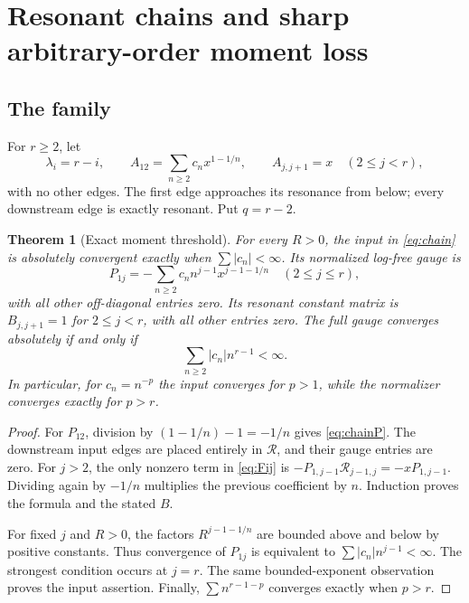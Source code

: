 \documentclass[11pt,a4paper]{article}
\numberwithin{equation}{section}
\newtheorem{theorem}{Theorem}[section]
\theoremstyle{definition}
\theoremstyle{remark}
\begin{document}
\section{Resonant chains and sharp arbitrary-order moment loss}
\label{sec:chain}

\subsection{The family}
For $r\geq2$, let
\begin{equation}\label{eq:chain}
 \lambda_i=r-i,\qquad
 A_{12}=\sum_{n\geq2}c_nx^{1-1/n},\qquad
 A_{j,j+1}=x\quad(2\leq j<r),
\end{equation}
with no other edges. The first edge approaches its resonance from below;
every downstream edge is exactly resonant. Put $q=r-2$.

\begin{theorem}[Exact moment threshold]\label{thm:chain}
For every $R>0$, the input in \eqref{eq:chain} is absolutely convergent
exactly when $\sum|c_n|<\infty$. Its normalized log-free gauge is
\begin{equation}\label{eq:chainP}
 P_{1j}=-\sum_{n\geq2}c_n n^{j-1}x^{j-1-1/n}
       \quad(2\leq j\leq r),
\end{equation}
with all other off-diagonal entries zero. Its resonant constant matrix is
$B_{j,j+1}=1$ for $2\leq j<r$, with all other entries zero. The full gauge
converges absolutely if and only if
\begin{equation}\label{eq:moment}
 \sum_{n\geq2}|c_n|n^{r-1}<\infty.
\end{equation}
In particular, for $c_n=n^{-p}$ the input converges for $p>1$, while the
normalizer converges exactly for $p>r$.
\end{theorem}
\begin{proof}
For $P_{12}$, division by $(1-1/n)-1=-1/n$ gives
\eqref{eq:chainP}. The downstream input edges are placed entirely in
$\mathcal R$, and their gauge entries are zero. For $j>2$, the only
nonzero term in \eqref{eq:Fij} is
$-P_{1,j-1}\mathcal R_{j-1,j}=-xP_{1,j-1}$.
Dividing again by $-1/n$ multiplies the previous coefficient by $n$.
Induction proves the formula and the stated $B$.

For fixed $j$ and $R>0$, the factors $R^{j-1-1/n}$ are bounded above and
below by positive constants. Thus convergence of $P_{1j}$ is equivalent
to $\sum|c_n|n^{j-1}<\infty$. The strongest condition occurs at $j=r$.
The same bounded-exponent observation proves the input assertion. Finally,
$\sum n^{r-1-p}$ converges exactly when $p>r$.
\end{proof}
\end{document}

